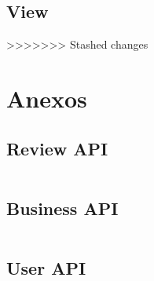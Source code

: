\documentclass[11pt]{article}
\begin{document}
\subsection{View}
>>>>>>> Stashed changes

\section{Anexos}

\subsection{Review API} \label{review_api}

\inputminted{java}{../src/Domain/Interfaces/IReview.java}

\subsection{Business API} \label{bus_api}

\inputminted{java}{../src/Domain/Interfaces/IBusiness.java}

\subsection{User API} \label{usr_api}

\inputminted{java}{../src/Domain/Interfaces/IUser.java}
\end{document}
